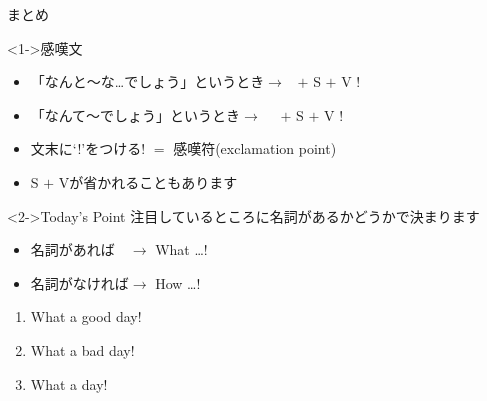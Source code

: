 \documentclass[aspectratio=169,xcolor={dvipsnames,table}]{beamer}
\begin{document}
\begin{frame}[plain]{まとめ}
 
\begin{block}<1->{感嘆文}
\begin{itemize}[square]\small
 \item \noindent{}「なんと～な\ldots{}でしょう」というとき$\longrightarrow$\,\,\,%
 $+$ S $+$ V !
 \item \noindent{}「なんて～でしょう」というとき$\longrightarrow$\,\,\,%
\,\,\,$+$ S $+$ V !
 \item   文末に`!'をつける\hfill{\scriptsize ! $=$ 感嘆符(exclamation point)}
 \item S $+$ Vが省かれることもあります

\end{itemize}
     \end{block}

\begin{block}<2->{Today's Point}\small
注目しているところに名詞があるかどうかで決まります
\begin{itemize}[square]\small
 \item 名詞があれば　$\longrightarrow$ What \ldots !
 \item 名詞がなければ$\longrightarrow$ How \ldots !
\end{itemize}
\end{block}
\end{frame}

\begin{frame}[plain]{}
\begin{enumerate}\large
 \item<1-> What a good day!
 \item<2-> What a bad day!
 \item<3-> What a day!
\end{enumerate}
\vfill
 \Huge\centering
{}

\hfill{\scriptsize {}}
\end{frame}
\end{document}
